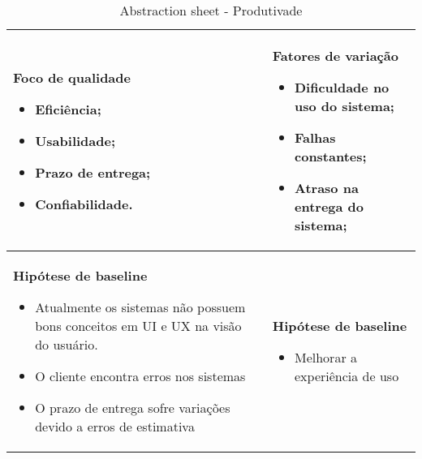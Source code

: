 \begin{table}[H]
\centering
\begin{tabular}{|p{4cm}|p{4cm}|}
\hline
	\begin{center}
	\textbf{Foco de qualidade}
	\end{center}

	\begin{itemize}
		\item{Eficiência;}
		\item{Usabilidade;}
		\item{Prazo de entrega;}
		\item{Confiabilidade.}
	\end{itemize}

	&

	\begin{center}
	\textbf{Fatores de variação}
	\end{center}

	\begin{itemize}
		\item{Dificuldade no uso do sistema;}
		\item{Falhas constantes;}
		\item{Atraso na entrega do sistema;}
	\end{itemize}

	\\ \hline
	\begin{center}
	\textbf{Hipótese de baseline}
	\end{center}
	\begin{itemize}
		\item{Atualmente os sistemas não possuem bons conceitos em UI e UX na visão do usuário.}
		\item{O cliente encontra erros nos sistemas}
		\item{O prazo de entrega sofre variações devido a erros de estimativa}

	\end{itemize}
	&

	\begin{center}
	\textbf{Hipótese de baseline}
	\end{center}

	\begin{itemize}
		\item Melhorar a experiência de uso
	\end{itemize}
	\\ \hline
\end{tabular}
\caption{Abstraction sheet - Produtivade}
\label{tab:produtividade_sheet}
\end{table}

